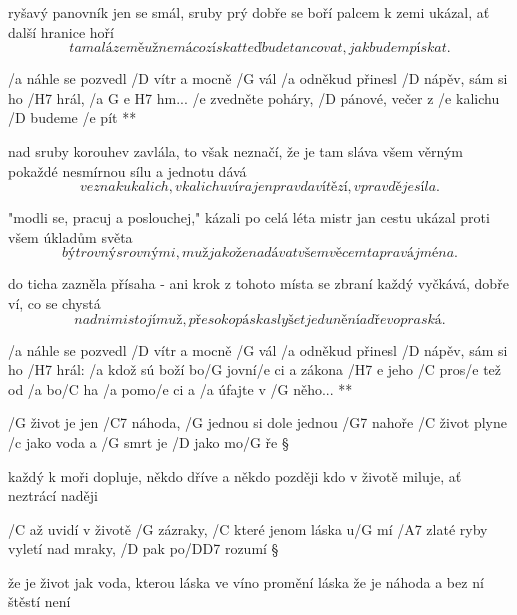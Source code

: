 ryšavý panovník jen se smál, sruby prý dobře se boří
palcem k zemi ukázal, ať další hranice hoří
\[ ta malá země už nemá co získat
teď bude tancovat, jak budem pískat. \]

\R  /a náhle se pozvedl /D vítr a mocně /G vál
    /a odněkud přinesl /D nápěv, sám si ho /H7 hrál, /{a G e H7} hm...
    /e zvedněte poháry, /D pánové, večer z /e kalichu /D budeme /e pít **

nad sruby korouhev zavlála, to však neznačí, že je tam sláva
všem věrným pokaždé nesmírnou sílu a jednotu dává
\[ ve znaku kalich, v kalichu víra
jen pravda vítězí, v pravdě je síla. \] \s

"modli se, pracuj a poslouchej," kázali po celá léta
mistr jan cestu ukázal proti všem úkladům světa
\[ být rovný s rovnými, muž jako žena
dávat všem věcem ta pravá jména. \] \s

do ticha zazněla přísaha - ani krok z tohoto místa
se zbraní každý vyčkává, dobře ví, co se chystá
\[ nad nimi stojí muž, přes oko páska
slyšet je dunění a dřevo praská. \]

\R  /a náhle se pozvedl /D vítr a mocně /G vál
    /a odněkud přinesl /D nápěv, sám si ho /H7 hrál:
    /a kdož sú boží bo/G jovní/e ci a zákona /{H7 e} jeho
    /C pros/e tež od /a bo/C ha /a pomo/e ci a /a úfajte v /G něho... **




/G život je jen /C7 náhoda, /G jednou si dole jednou /G7 nahoře
/C život plyne /c jako voda a /G smrt je /D jako mo/G ře \S

každý k moři dopluje, někdo dříve a někdo později
kdo v životě miluje, ať neztrácí naději \s

/C až uvidí v životě /G zázraky, /C které jenom láska u/G mí
/A7 zlaté ryby vyletí nad mraky, /D pak po/{D\dim D7} rozumí \S

že je život jak voda, kterou láska ve víno promění
láska že je náhoda a bez ní štěstí není



\bye
